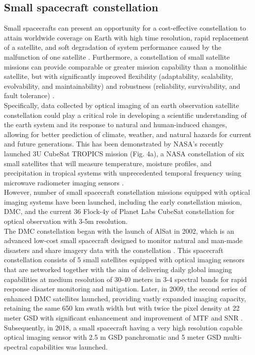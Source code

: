 \documentclass[final,5p,times,twocolumn,authoryear]{elsarticle}
\begin{document}
\subsection{Small spacecraft constellation}
Small spacecrafts can present an opportunity for a cost-effective constellation to attain worldwide coverage on Earth with high time resolution, rapid replacement of a satellite, and soft degradation of system performance caused by the malfunction of one satellite \citep{sandau2010small}. Furthermore, a constellation of small satellite missions can provide comparable or greater mission capability than a monolithic satellite, but with significantly improved flexibility (adaptability, scalability, evolvability, and maintainability) and robustness (reliability, survivability, and fault tolerance) \citep{bandyopadhyay2016review}. \\
Specifically, data collected by optical imaging of an earth observation satellite constellation  could play a critical role in developing a scientific understanding of the earth system and its response to natural and human-induced changes, allowing for better prediction of climate, weather, and natural hazards for current and future generations. This has been demonstrated by NASA's recently launched 3U CubeSat TROPICS mission (Fig. 4a), a NASA constellation of six small satellites that will measure temperature, moisture profiles, and precipitation in tropical systems with unprecedented temporal frequency using microwave radiometer imaging sensors \citep{blackwell2018overview}.\\
However, number of small spacecraft constellation missions equipped with optical imaging systems have been launched, including the early constellation mission, DMC, and the current 36 Flock-4y of Planet Labs CubeSat constellation for optical observation with 3-5m resolution. \\
The DMC constellation began with the launch of AlSat in 2002, which is an advanced low-cost small spacecraft designed to monitor natural and man-made disasters and share imagery data with the constellation \cite{surry2002}. This spacecraft constellation consists of 5 small satellites equipped with optical imaging sensors that are networked together with the aim of delivering daily global imaging capabilities at medium resolution of 30-40 meters in 3-4 spectral bands for rapid response disaster monitoring and mitigation.  Later, in 2009, the second series of enhanced DMC satellites launched, providing vastly expanded imaging capacity, retaining the same 650 km swath width but with twice the pixel density at 22 meter GSD with significant enhancement and improvement of MTF and SNR \citep{surry2002}.  Subsequently, in 2018, a small spacecraft having a very high resolution capable optical imaging sensor with 2.5 m GSD panchromatic and 5 meter GSD multi-spectral capabilities was launched.\\
\end{document}
